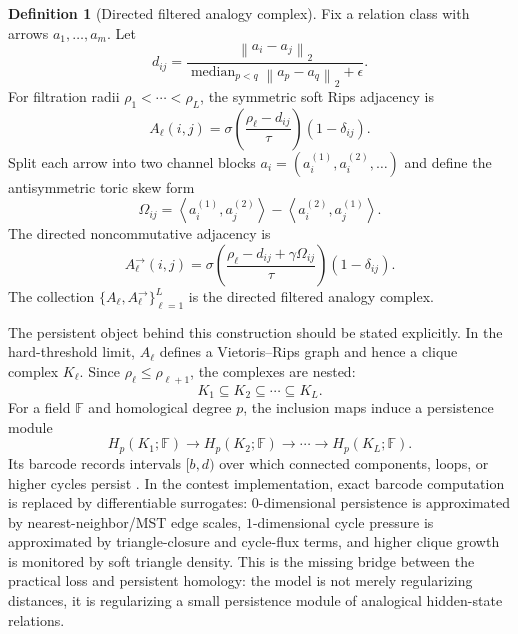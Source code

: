 \documentclass[11pt]{article}
\theoremstyle{definition}
\newtheorem{definition}{Definition}[section]
\theoremstyle{plain}
\theoremstyle{remark}
\numberwithin{equation}{section}
\newcommand{\norm}[1]{\left\lVert #1\right\rVert}
\newcommand{\ip}[2]{\left\langle #1,#2\right\rangle}
\begin{document}
\begin{definition}[Directed filtered analogy complex]
Fix a relation class with arrows $a_1,\ldots,a_m$.  Let
\begin{equation}
  d_{ij}=\frac{\norm{a_i-a_j}_2}{\operatorname{median}_{p<q}\norm{a_p-a_q}_2+\epsilon}.
\end{equation}
For filtration radii $\rho_1<\cdots<\rho_L$, the symmetric soft Rips adjacency is
\begin{equation}
  A_\ell(i,j)=\sigma\left(\frac{\rho_\ell-d_{ij}}{\tau}\right)(1-\delta_{ij}).
\end{equation}
Split each arrow into two channel blocks $a_i=(a_i^{(1)},a_i^{(2)},\ldots)$ and define the antisymmetric toric skew form
\begin{equation}
  \Omega_{ij}=\ip{a_i^{(1)}}{a_j^{(2)}}-\ip{a_i^{(2)}}{a_j^{(1)}}.
\end{equation}
The directed noncommutative adjacency is
\begin{equation}
  A_\ell^\rightarrow(i,j)
  =\sigma\left(\frac{\rho_\ell-d_{ij}+\gamma\Omega_{ij}}{\tau}\right)(1-\delta_{ij}).
\end{equation}
The collection $\{A_\ell,A_\ell^\rightarrow\}_{\ell=1}^L$ is the directed filtered analogy complex.
\end{definition}

The persistent object behind this construction should be stated explicitly.  In the hard-threshold limit, $A_\ell$ defines a Vietoris--Rips graph and hence a clique complex $K_\ell$.  Since $\rho_\ell\le\rho_{\ell+1}$, the complexes are nested:
\begin{equation}
  K_1\subseteq K_2\subseteq\cdots\subseteq K_L.
\end{equation}
For a field $\mathbb F$ and homological degree $p$, the inclusion maps induce a persistence module
\begin{equation}
  H_p(K_1;\mathbb F)\to H_p(K_2;\mathbb F)\to\cdots\to H_p(K_L;\mathbb F).
\end{equation}
Its barcode records intervals $[b,d)$ over which connected components, loops, or higher cycles persist \cite{edelsbrunner2002topological,zomorodian2005computing,carlsson2009topology}.  In the contest implementation, exact barcode computation is replaced by differentiable surrogates: $0$-dimensional persistence is approximated by nearest-neighbor/MST edge scales, $1$-dimensional cycle pressure is approximated by triangle-closure and cycle-flux terms, and higher clique growth is monitored by soft triangle density.  This is the missing bridge between the practical loss and persistent homology: the model is not merely regularizing distances, it is regularizing a small persistence module of analogical hidden-state relations.
\end{document}
